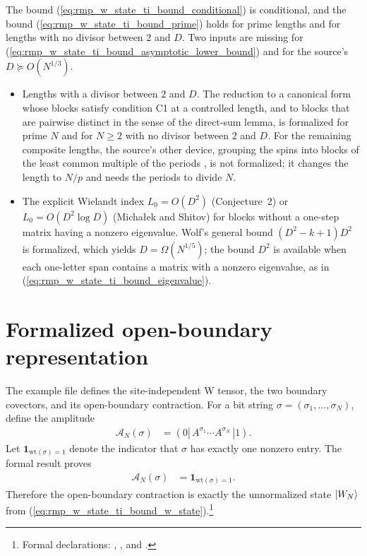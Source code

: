 \documentclass{article}
\begin{document}
The bound (\ref{eq:rmp_w_state_ti_bound_conditional}) is conditional, and
the bound (\ref{eq:rmp_w_state_ti_bound_prime}) holds for prime lengths
and for lengths with no divisor between $2$ and $D$. Two inputs are missing for
(\ref{eq:rmp_w_state_ti_bound_asymptotic_lower_bound}) and for the source's
$D\succeq O(N^{1/3})$.
\begin{itemize}
    \item Lengths with a divisor between $2$ and $D$. The reduction to a canonical form whose blocks
          satisfy condition C1 at a controlled length, and to blocks that are
          pairwise distinct in the sense of the direct-sum lemma, is formalized for
          prime $N$ and for $N\geq2$ with no divisor between $2$ and $D$. For the
          remaining composite lengths, the source's other device, grouping the spins
          into blocks of the least common multiple of the periods
          \cite[lines~2094--2096]{PerezGarcia2007MPSReps}, is not formalized; it
          changes the length to $N/p$ and needs the periods to divide $N$.

    \item The explicit Wielandt index $L_0=O(D^2)$ (Conjecture~2) or
          $L_0=O(D^2\log D)$ (Micha\l{}ek and Shitov) for blocks without a
          one-step matrix having a nonzero eigenvalue. Wolf's general bound
          $(D^2-k+1)D^2$ is formalized, which yields $D=\Omega(N^{1/5})$;
          the bound $D^2$ is available when each one-letter span contains a matrix
          with a nonzero eigenvalue, as in
          (\ref{eq:rmp_w_state_ti_bound_eigenvalue}).
\end{itemize}

\section{Formalized open-boundary representation}

The example file defines the site-independent W tensor, the two boundary
covectors, and its open-boundary contraction. For a bit string
$\sigma=(\sigma_1,\ldots,\sigma_N)$, define the amplitude
\begin{align}
    \mathcal A_N(\sigma)
     & =
    (0|\,A^{\sigma_1}\cdots A^{\sigma_N}\,|1).
    \label{eq:rmp_w_state_ti_bound_open_boundary_amplitude}
\end{align}
Let $\mathbf{1}_{\mathrm{wt}(\sigma)=1}$ denote the indicator that
$\sigma$ has exactly one nonzero entry. The formal result proves
\begin{align}
    \mathcal A_N(\sigma)
     & =
    \mathbf{1}_{\mathrm{wt}(\sigma)=1}.
    \label{eq:rmp_w_state_ti_bound_single_excitation_indicator}
\end{align}
Therefore the open-boundary contraction is exactly the unnormalized state
$|W_N\rangle$ from (\ref{eq:rmp_w_state_ti_bound_w_state}).\footnote{Formal
    declarations:
    ,
    , and
    .}
\end{document}
